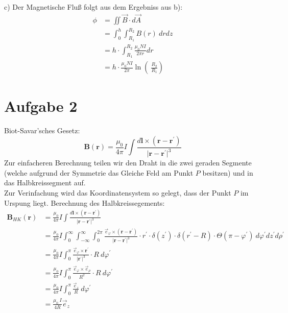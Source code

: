 \documentclass[11pt a4paper]{article}
\begin{document}
c) Der Magnetische Fluß folgt aus dem Ergebniss aus b):
\begin{align*}
	\phi &= \iint \vec B \cdot d\vec A \\
	&= \int_0^h \int_{R_1}^{R_2} B(r) \ dr dz \\
	&= h \cdot \int_{R_1}^{R_2} \frac{\mu_0 NI}{2\pi r} dr \\
	&= h \cdot \frac{\mu_0 NI}{2\pi} \ln\left(\
		\frac{R_2}{R_1} \right)
\end{align*}


\newpage
\setlength{\headheight}{0cm}
\section*{Aufgabe 2}
Biot-Savar'sches Gesetz:
\[
	\mathbf B(\mathbf r) = \frac{\mu_0}{4\pi} I \int \frac
	{d\mathbf l \times (\mathbf r - \mathbf{r^\prime})}
	{\vert \mathbf r - \mathbf{r^\prime}\vert^3}
\]
Zur einfacheren Berechnung teilen wir den Draht in die zwei geraden 
Segmente (welche aufgrund der Symmetrie das Gleiche Feld am Punkt $P$ 
besitzen) und in das Halbkreissegment auf. \\
Zur Verinfachung wird das Koordinatensystem so gelegt, dass der Punkt 
$P$ im Urspung liegt. 
\newline
Berechnung des Halbkreissegements:
\begin{align*}
	\mathbf B_{HK}(\mathbf r) 
	&= \frac{\mu_0}{4\pi} I \int \frac
	{d\mathbf l \times (\mathbf r - \mathbf{r^\prime})}
	{\vert \mathbf r - \mathbf{r^\prime}\vert^3} \\
	&= \frac{\mu_0}{4\pi} I
	\int_0^\infty \int_{-\infty}^\infty \int_0^{2\pi}
	\frac
	{\vec e_\varphi \times (\mathbf r - \mathbf{r^\prime})}
	{\vert \mathbf r - \mathbf{r^\prime}\vert^3}
	\cdot r^\prime \cdot
	\delta(z^\prime) \cdot \delta(r^\prime - R) \cdot 
	\Theta(\pi - \varphi^\prime)
	\ d\varphi^\prime dz^\prime d\rho^\prime \\
	&= \frac{\mu_0}{4\pi} I
	\int_0^{\pi}
	\frac
	{\vec e_\varphi \times \mathbf{r^\prime}}
	{\vert \mathbf{r^\prime}\vert^3} \cdot R
	\ d\varphi^\prime \\
	&= \frac{\mu_0}{4\pi} I
	\int_0^{\pi} \frac
	{\vec e_\varphi \times \vec e_\rho}
	{R^2}
	\cdot R
	\ d\varphi^\prime \\
	&= \frac{\mu_0}{4\pi} I
	\int_0^{\pi} \frac
	{\vec e_z}
	{R}
	\ d\varphi^\prime \\
	&= \frac{\mu_0 \ I}{4R} \vec e_z
\end{align*}
\end{document}
